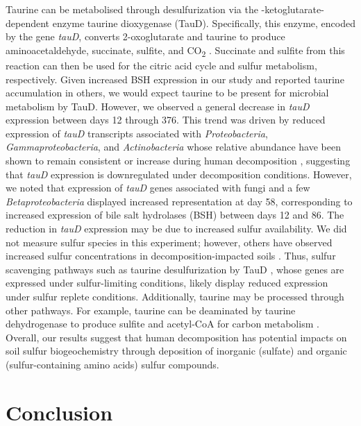 \documentclass[
  sn-nature,
  lineno, referee]{sn-jnl}
\begin{document}
Taurine can be metabolised through desulfurization via the
\textalpha-ketoglutarate-dependent enzyme taurine dioxygenase (TauD).
Specifically, this enzyme, encoded by the gene \emph{tauD}, converts
2-oxoglutarate and taurine to produce aminoacetaldehyde, succinate,
sulfite, and CO\textsubscript{2} \citep{cook_metabolism_2006}. Succinate
and sulfite from this reaction can then be used for the citric acid
cycle and sulfur metabolism, respectively. Given increased BSH
expression in our study and reported taurine accumulation in others, we
would expect taurine to be present for microbial metabolism by TauD.
However, we observed a general decrease in \emph{tauD} expression
between days 12 through 376. This trend was driven by reduced expression
of \emph{tauD} transcripts associated with \emph{Proteobacteria},
\emph{Gammaproteobacteria}, and \emph{Actinobacteria} whose relative
abundance have been shown to remain consistent or increase during human
decomposition \citep{cobaugh_functional_2015}, suggesting that
\emph{tauD} expression is downregulated under decomposition conditions.
However, we noted that expression of \emph{tauD} genes associated with
fungi and a few \emph{Betaproteobacteria} displayed increased
representation at day 58, corresponding to increased expression of bile
salt hydrolases (BSH) between days 12 and 86. The reduction in
\emph{tauD} expression may be due to increased sulfur availability. We
did not measure sulfur species in this experiment; however, others have
observed increased sulfur concentrations in decomposition-impacted soils
\citep{aitkenhead-peterson_mapping_2012, taylor_soil_2023, debruyn_carrion_2024}.
Thus, sulfur scavenging pathways such as taurine desulfurization by TauD
\citep{kertesz_riding_2000}, whose genes are expressed under
sulfur-limiting conditions, likely display reduced expression under
sulfur replete conditions. Additionally, taurine may be processed
through other pathways. For example, taurine can be deaminated by
taurine dehydrogenase to produce sulfite and acetyl-CoA for carbon
metabolism \citep{cook_metabolism_2006, bruggemann_enzymes_2004}.
Overall, our results suggest that human decomposition has potential
impacts on soil sulfur biogeochemistry through deposition of inorganic
(sulfate) and organic (sulfur-containing amino acids) sulfur compounds.

\section{Conclusion}\label{conclusion}
\end{document}
